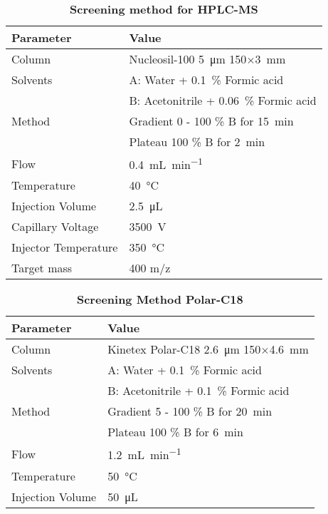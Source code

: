 	\begin{table}[htbp]
		\caption[Screening method for HPLC-MS]{\textbf{Screening method for HPLC-MS}}
		\label{tab:method_ms_1}
		\centering
		\begin{tabularx}{\textwidth}{XX}
			\toprule
			\textbf{Parameter}	& \textbf{Value}	\\
			\midrule
			Column 		& Nucleosil-100 \SI{5}{\micro\meter} 150$\times$\SI{3}{\milli\meter} 	\\
			Solvents	& A: Water + 0.1~\% Formic acid 	\\
						& B: Acetonitrile + 0.06~\% Formic acid		\\
			Method 		& Gradient 0 - 100 \% B for \SI{15}{\minute} 	\\
						& Plateau 100 \% B for \SI{2}{\minute} 	\\
			Flow 		& \SI{0.4}{\milli\liter\per\minute} \\
			Temperature & \SI{40}{\celsius} 	\\
			Injection Volume 	& \SI{2.5}{\micro\liter} 	\\
			\midrule
			Capillary Voltage 	& \SI{3500}{\volt} 	\\
			Injector Temperature& \SI{350}{\celsius}\\
			Target mass 		& 400 m/z 			\\
			\bottomrule
		\end{tabularx}
	\end{table}

	\begin{table}[htbp]
		\caption[Screening Method Polar-C18]{\textbf{Screening Method Polar-C18}}
		\label{tab:method_polarc18_screening}
		\centering
		\begin{tabularx}{\textwidth}{XX}
			\toprule
			\textbf{Parameter}	& \textbf{Value}	\\
			\midrule
			Column 		& Kinetex Polar-C18 \SI{2.6}{\micro\meter} 150$\times$\SI{4.6}{\milli\meter} 	\\
			Solvents	& A: Water + 0.1~\% Formic acid 	\\
						& B: Acetonitrile + 0.1~\% Formic acid		\\
			Method 		& Gradient 5 - 100 \% B for \SI{20}{\minute} 	\\
						& Plateau 100 \% B for \SI{6}{\minute} 	\\
			Flow 		& \SI{1.2}{\milli\liter\per\minute} \\
			Temperature & \SI{50}{\celsius} 	\\
			Injection Volume 	& \SI{50}{\micro\liter} 	\\
			\bottomrule
		\end{tabularx}
	\end{table}

